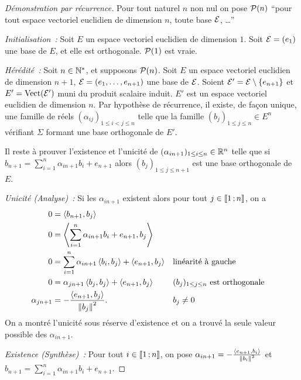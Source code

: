 \begin{proof}[Démonstration par récurrence]
  Pour tout naturel $n$ non nul on pose $\P(n)$ ``pour tout espace vectoriel euclidien de dimension $n$, toute base $\E$, \ldots''

  \emph{Initialisation~:} Soit $E$ un espace vectoriel euclidien de dimension $1$. Soit $\E=(e_1)$ une base de $E$, et elle est orthogonale. $\P(1)$ est vraie.

  \emph{Hérédité~:} Soit $n \in \N^*$, et supposons $\P(n)$. Soit $E$ un espace vectoriel euclidien de dimension $n+1$, $\E=(e_1, \ldots, e_{n+1})$ une base de $\E$. Soient $\E'=\E\setminus\{e_{n+1}\}$ et $E'=\VectEngendre(\E')$ muni du produit scalaire induit. $E'$ est un espace vectoriel euclidien de dimension $n$. Par hypothèse de récurrence, il existe, de façon unique, une famille de réels $(\alpha_{ij})_{1 \leq i<j \leq n}$ telle que la famille $(b_j)_{1 \leq j \leq n} \in E^n$ vérifiant $\Sigma$ formant une base orthogonale de $E'$. 

  Il reste à prouver l'existence et l'unicité de $(\alpha_{i n+1})_{1 \leq i \leq n} \in \R^n$ telle que si $b_{n+1} = \sum_{i=1}^{n} \alpha_{i n+1}b_i  + e_{n+1}$ alors $(b_j)_{1 \leq j \leq n+1}$ est une base orthogonale de $E$.

  \emph{Unicité (Analyse)~:} Si les $\alpha_{i n+1}$ existent alors pour tout $j \in \intervalleentier{1}{n}$, on a
  \begin{align}
    0 &= \prodscal{b_{n+1}}{b_j} \\
    0 &= \prodscal{\sum_{i=1}^{n} \alpha_{i n+1}b_i  + e_{n+1}}{b_j}\\
    0 &= \sum_{i=1}^{n} \alpha_{i n+1} \prodscal{b_i}{b_j} + \prodscal{e_{n+1}}{b_j} && \text{linéarité à gauche}\\
    0 &= \alpha_{j n+1} \prodscal{b_j}{b_j} + \prodscal{e_{n+1}}{b_j} && (b_j)_{1 \leq j \leq n} \text{~est orthogonale}\\
    \alpha_{j n+1} &= -\frac{\prodscal{e_{n+1}}{b_j}}{\norme{b_j}^2}. && b_j \neq 0
  \end{align}
  On a montré l'unicité sous réserve d'existence et on a trouvé la seule valeur possible des $\alpha_{i n+1}$.

  \emph{Existence (Synthèse)~:} Pour tout $i \in \intervalleentier{1}{n}$, on pose $\alpha_{i n+1} = -\frac{\prodscal{e_{n+1}}{b_i}}{\norme{b_i}^2}$ et $b_{n+1}=\sum_{i=1}^{n} \alpha_{i n+1}b_i  + e_{n+1}$. 


\end{proof}
